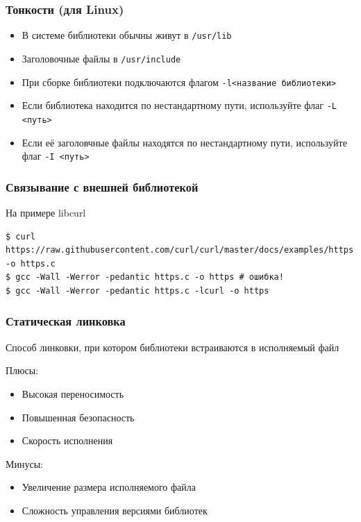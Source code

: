 \documentclass[aspectratio=169]{beamer}
\begin{document}
\begin{frame}
    \frametitle{Тонкости (для Linux)}

    \begin{itemize}
        \item В системе библиотеки обычны живут в \texttt{/usr/lib}
        \item Заголовочные файлы в \texttt{/usr/include}
        \item При сборке библиотеки подключаются флагом \texttt{-l<название библиотеки>}
        \item Если библиотека находится по нестандартному пути, используйте флаг \texttt{-L <путь>}
        \item Если её заголовчные файлы находятся по нестандартному пути, используйте флаг \texttt{-I <путь>}
    \end{itemize}

\end{frame}

\begin{frame}[fragile]
    \frametitle{Связывание с внешней библиотекой}

    На примере libcurl
    \begin{verbatim}
$ curl https://raw.githubusercontent.com/curl/curl/master/docs/examples/https.c -o https.c
$ gcc -Wall -Werror -pedantic https.c -o https # ошибка!
$ gcc -Wall -Werror -pedantic https.c -lcurl -o https
    \end{verbatim}
\end{frame}

\begin{frame}
    \frametitle{Статическая линковка}

    Способ линковки, при котором библиотеки встраиваются в исполняемый файл

    Плюсы:
    \begin{itemize}
        \item Высокая переносимость
        \item Повышенная безопасность
        \item Скорость исполнения
    \end{itemize}
    Минусы:
    \begin{itemize}
        \item Увеличение размера исполняемого файла
        \item Сложность управления версиями библиотек
    \end{itemize}
\end{frame}
\end{document}
